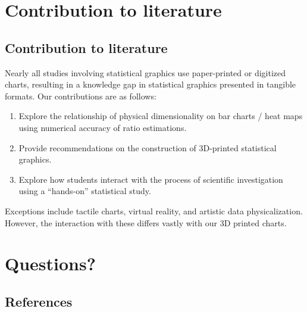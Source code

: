 \documentclass[phd]{nuthesis}
\begin{document}
\section{Contribution to literature}\label{contribution-to-literature}

\subsection{Contribution to
literature}\label{contribution-to-literature-1}

Nearly all studies involving statistical graphics use paper-printed or
digitized charts, resulting in a knowledge gap in statistical graphics
presented in tangible formats. Our contributions are as follows:

\begin{enumerate}
\def\labelenumi{\arabic{enumi}.}
\tightlist
\item
  Explore the relationship of physical dimensionality on bar charts /
  heat maps using numerical accuracy of ratio estimations.
\item
  Provide recommendations on the construction of 3D-printed statistical
  graphics.
\item
  Explore how students interact with the process of scientific
  investigation using a ``hands-on'' statistical study.
\end{enumerate}

Exceptions include tactile charts, virtual reality, and artistic data
physicalization. However, the interaction with these differs vastly with
our 3D printed charts.

\section{Questions?}\label{questions}

\subsection{References}\label{references}
\end{document}
